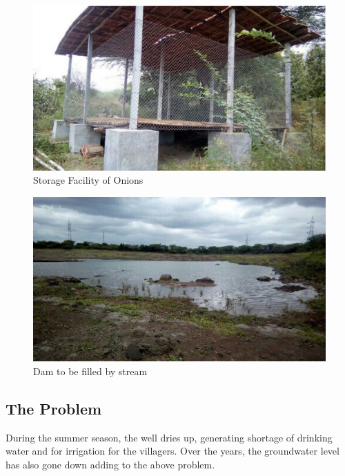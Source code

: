 \documentclass{article}
\begin{document}
\begin{figure}[h]
\begin{center}
  \includegraphics[scale=0.4]{images/onion_storage.jpg}
  \\
  Storage Facility of Onions
\end{center}
\end{figure}

\begin{figure}[h]
\begin{center}
  \includegraphics[scale=0.4]{images/dam.jpg}
  \\
  Dam to be filled by stream
\end{center}
\end{figure}

\subsection{The Problem}
During the summer season, the well dries up, generating shortage of drinking water and for irrigation for the villagers. Over the years, the groundwater level has also gone down adding to the above problem.
\end{document}

